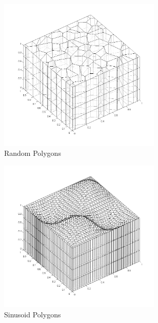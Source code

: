 \begin{figure}
\begin{subfigure}[b]{0.45\textwidth}
		\centering
		\includegraphics[width=0.85\textwidth]{figures/sec_DSA/SIP_poly_extruded_mesh.png}
		\caption{Random Polygons}
	\end{subfigure}
	\vfill
	\begin{subfigure}[b]{0.45\textwidth}
		\centering
		\includegraphics[width=0.85\textwidth]{figures/sec_DSA/SIP_sine_poly_extruded_mesh.png}
		\caption{Sinusoid Polygons}
	\end{subfigure}
	\hfill
	\begin{subfigure}[b]{0.45\textwidth}
		\centering

\end{subfigure}
\end{figure}
